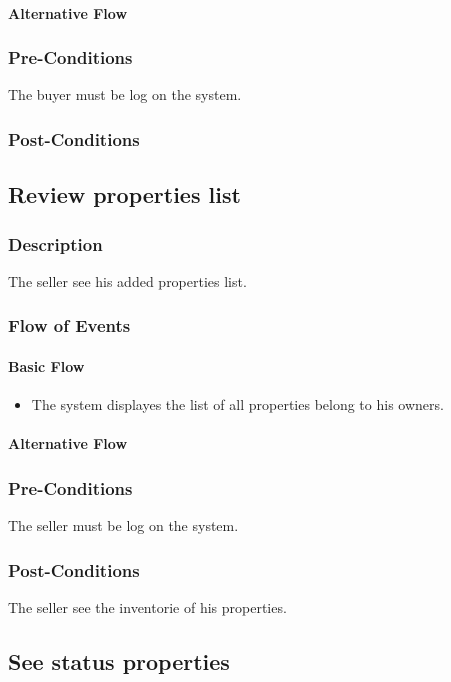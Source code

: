 \documentclass[a4paper,12pt]{article}
\begin{document}
\paragraph{Alternative Flow}
\begin{itemize}
\end{itemize}
\subsubsection{Pre-Conditions}
The buyer must be log on the system.
\subsubsection{Post-Conditions}


\subsection{Review properties list}
\subsubsection{Description}
The seller see his added properties list.
\subsubsection{Flow of Events}
\paragraph{Basic Flow}
\begin{itemize}
\item The system displayes the list of all properties belong to his owners.
\end{itemize}
\paragraph{Alternative Flow}
\begin{itemize}
\end{itemize}
\subsubsection{Pre-Conditions}
The seller must be log on the system.
\subsubsection{Post-Conditions}
The seller see the inventorie of his properties.

\subsection{See status properties}
\end{document}

